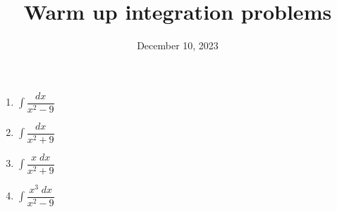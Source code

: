 \documentclass{article}
\begin{document}
\title{Warm up integration problems}
\date{December 10, 2023}
\maketitle
\begin{enumerate}
	\item $\displaystyle \int \dfrac{dx}{x^2-9}$
	\item $\displaystyle  \int \dfrac{dx}{x^2+9}$
	\item $\displaystyle  \int \dfrac{x \; dx}{x^2 + 9}$
	\item $\displaystyle \int \dfrac{x^3 \; dx}{x^2 -9 }$
\end{enumerate}
\end{document}
